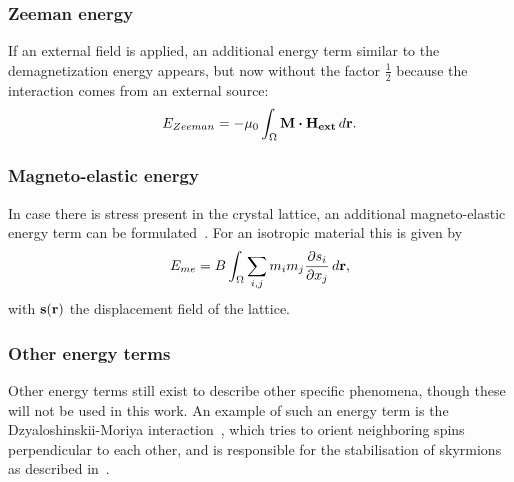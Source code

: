 \documentclass[11pt,a4paper,english]{article}
\begin{document}
\subsubsection{Zeeman energy}
If an external field is applied, an additional energy term similar to the demagnetization energy appears, but now without the factor $\frac{1}{2}$ because the interaction comes from an external source:
\begin{equation}
    E_{Zeeman} = -\mu_0 \int_\Omega \vb{M} \vdot \vb{H_{ext}} \, d\vb{r} \mathrm{.} \label{eq:Energy_Term_Zeeman}
\end{equation}

\subsubsection{Magneto-elastic energy}
\label{par:Energy_MagnetoElastic}
In case there is stress present in the crystal lattice, an additional magneto-elastic energy term can be formulated~\cite{Gilbert1956}. For an isotropic material this is given by
\begin{equation}
    E_{me} = B \int_\Omega \sum_{i,j} m_i m_j \frac{\partial s_i}{\partial x_j} \,d\vb{r} \mathrm{,}
\end{equation}
with $\vb{s}(\vb{r})$ the displacement field of the lattice.

\subsubsection{Other energy terms}
Other energy terms still exist to describe other specific phenomena, though these will not be used in this work. An example of such an energy term is the Dzyaloshinskii-Moriya interaction~\cite{DzyaloshinskiiMoriya}, which tries to orient neighboring spins perpendicular to each other, and is responsible for the stabilisation of skyrmions as described in~\cite{skyrmions}.
\end{document}
